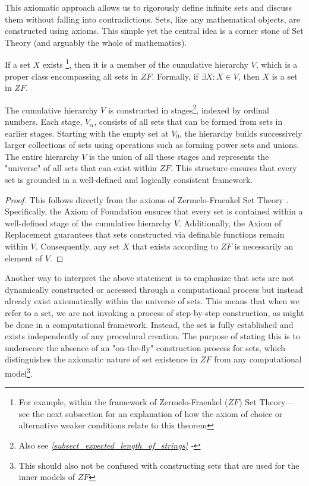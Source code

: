 This axiomatic approach allows us to rigorously define infinite sets and discuss them without falling into contradictions. Sets, like any mathematical objects, are constructed using axioms. This simple yet the central idea is a corner stone of Set Theory (and arguably the whole of mathematics). 

\begin{theorem}
  If a set $X$ exists \footnote{For example, within the framework of Zermelo-Fraenkel ($ZF$) Set Theory—see the next subsection for an explanation of how the axiom of choice or alternative weaker conditions relate to this theorem}, then it is a member of the cumulative hierarchy $V$, which is a proper class encompassing all sets in $ZF$. Formally, if $\exists X: X \in V$, then $X$ is a set in $ZF$. 
\end{theorem} 

The cumulative hierarchy $V$ is constructed in stages\footnote{Also see \textit{\ref{subsect_expected_length_of_strings} - }}, indexed by ordinal numbers. Each stage, $V_\alpha$, consists of all sets that can be formed from sets in earlier stages. Starting with the empty set at $V_0$​, the hierarchy builds successively larger collections of sets using operations such as forming power sets and unions. The entire hierarchy $V$ is the union of all these stages and represents the "universe" of all sets that can exist within $ZF$. This structure ensures that every set is grounded in a well-defined and logically consistent framework.

\begin{proof} This follows directly from the axioms of Zermelo-Fraenkel Set Theory \cite{kunen1980set, jech2003set}. Specifically, the Axiom of Foundation ensures that every set is contained within a well-defined stage of the cumulative hierarchy $V$. Additionally, the Axiom of Replacement guarantees that sets constructed via definable functions remain within $V$. Consequently, any set $X$ that exists according to $ZF$ is necessarily an element of $V$. \end{proof}

Another way to interpret the above statement is to emphasize that sets are not dynamically constructed or accessed through a computational process but instead already exist axiomatically within the universe of sets. This means that when we refer to a set, we are not invoking a process of step-by-step construction, as might be done in a computational framework. Instead, the set is fully established and exists independently of any procedural creation. The purpose of stating this is to underscore the absence of an "on-the-fly" construction process for sets, which distinguishes the axiomatic nature of set existence in $ZF$ from any computational model\footnote{This should also not be confused with constructing sets that are used for the inner models of $ZF$}.

